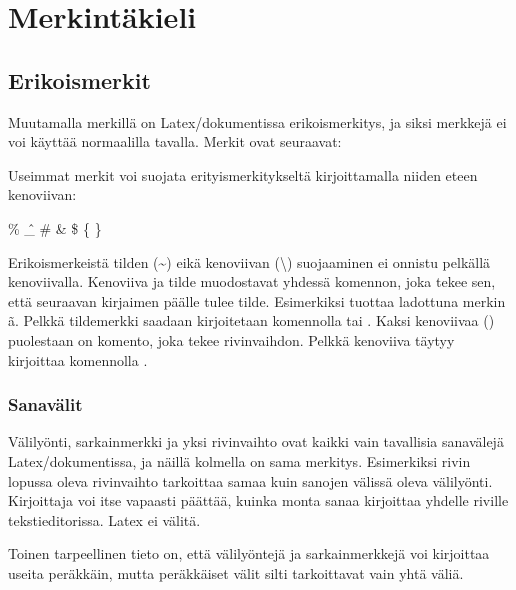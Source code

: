 \chapter{Merkintäkieli}
\section{Erikoismerkit}

Muutamalla merkillä on Latex\-/dokumentissa erikoismerkitys, ja siksi
merkkejä ei voi käyttää normaalilla tavalla. Merkit ovat seuraavat:

\begin{koodilohkosis}
\end{koodilohkosis}

Useimmat merkit voi suojata erityismerkitykseltä kirjoittamalla niiden
eteen kenoviivan:

\begin{koodilohkosis}
  \% \^ \_ \# \& \$ \{ \}
\end{koodilohkosis}

Erikoismerkeistä tilden (\textasciitilde) eikä kenoviivan
(\textbackslash) suojaaminen ei onnistu pelkällä kenoviivalla. Kenoviiva
ja tilde muodostavat yhdessä komennon, joka tekee sen, että seuraavan
kirjaimen päälle tulee tilde. Esimerkiksi
 tuottaa ladottuna merkin ã.
Pelkkä tildemerkki saadaan kirjoitetaan komennolla
\koodi{\textbackslash\textasciitilde\{\}} tai . Kaksi kenoviivaa (\koodi{\keno\keno}) puolestaan on
komento, joka tekee rivinvaihdon. Pelkkä kenoviiva täytyy kirjoittaa
komennolla .


\subsection{Sanavälit}

Välilyönti, sarkainmerkki ja yksi rivinvaihto ovat kaikki vain
tavallisia sanavälejä Latex\-/dokumentissa, ja näillä kolmella on sama
merkitys. Esimerkiksi rivin lopussa oleva rivinvaihto tarkoittaa samaa
kuin sanojen välissä oleva välilyönti. Kirjoittaja voi itse vapaasti
päättää, kuinka monta sanaa kirjoittaa yhdelle riville tekstieditorissa.
Latex ei välitä.

Toinen tarpeellinen tieto on, että välilyöntejä ja sarkainmerkkejä voi
kirjoittaa useita peräkkäin, mutta peräkkäiset välit silti tarkoittavat
vain yhtä väliä.

